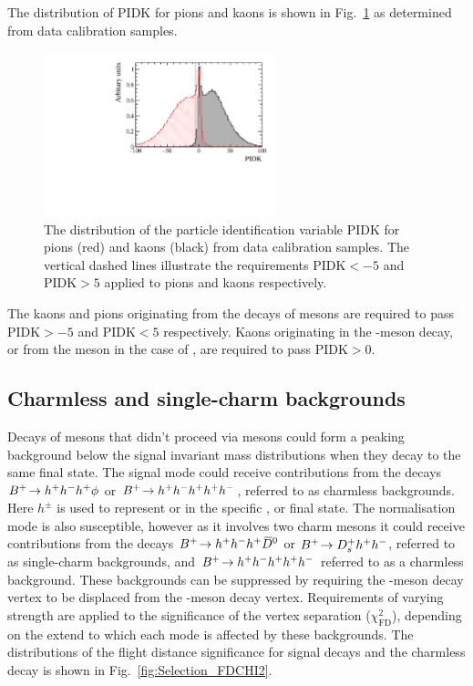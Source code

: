The distribution of PIDK for pions and kaons is shown in Fig.~\ref{fig:selection_PIDK_distribution} as determined from data calibration samples.
\begin{figure}[!h]
    \centering
        \includegraphics[width=0.6\textwidth]{figs/Selection/Calib_sample_PIDK.pdf}
        \caption{The distribution of the particle identification variable PIDK for pions (red) and kaons (black) from data calibration samples. The vertical dashed lines illustrate the requirements $\text{PIDK}<-5$ and $\text{PIDK}>5$ applied to pions and kaons respectively.}
    \label{fig:selection_PIDK_distribution}   
\end{figure}

The kaons and pions originating from the decays of \Dsp mesons are required to pass $\text{PIDK} > -5$ and $\text{PIDK} < 5$ respectively. Kaons originating in the \phiz-meson decay, or from the \Bp meson in the case of \decay{\Bp}{\Dsp\Kp\Km}, are required to pass $\text{PIDK} > 0$. 



\subsection{Charmless and single-charm backgrounds}


Decays of \Bp mesons that didn't proceed via \D mesons could form a peaking background below the signal invariant mass distributions when they decay to the same final state.
The signal mode could receive contributions from the decays ${{{B}^+}}\!\rightarrow h^{+}h^{-}h^{+}\phi$ or ${{{B}^+}}\!\rightarrow h^{+}h^{-}h^{+}h^{+}h^{-}$, referred to as charmless backgrounds. Here $h^{\pm}$ is used to represent \Kpm or \pipm in the specific \Dsp, \Dzb or \phiz final state.
The normalisation mode is also susceptible, however as it involves two charm mesons it could receive contributions from the decays ${{{B}^+}}\!\rightarrow h^{+}h^{-}h^{+}{{\kern 0.2em\overline{\kern -0.2em D}{}}{}^0}$ or ${{{B}^+}}\!\rightarrow {\ensuremath{{D}^+_{s}}} h^{+}h^{-}$, referred to as single-charm backgrounds, and ${{{B}^+}}\!\rightarrow h^{+}h^{-}h^{+} h^{+}h^{-}$ referred to as a charmless background.
These backgrounds can be suppressed by requiring the \D-meson decay vertex to be displaced from the \Bp-meson decay vertex. Requirements of varying strength are applied to the significance of the vertex separation ($\chi^{2}_{\text{FD}}$), depending on the extend to which each mode is affected by these backgrounds. The distributions of the flight distance significance for \decay{\Bp}{(\decay{\Dsp}{\Kp\pim\pip})\phiz} signal decays and the charmless \decay{\Bp}{\Kp\pim\pip\phiz} decay is shown in Fig.~\ref{fig:Selection_FDCHI2}.

